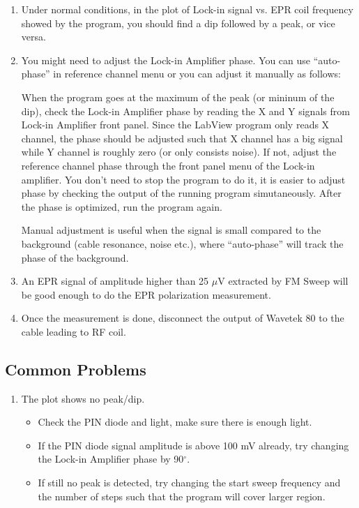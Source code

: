 {\begin{enumerate}
\item Under normal conditions,
 in the plot of Lock-in signal vs. EPR coil frequency showed
by the program, you should find a dip followed by a peak, or vice versa.  

\item You might need to adjust the Lock-in Amplifier phase. You can use
``auto-phase'' in reference channel menu or you can adjust it manually
as follows:

When the program goes at the maximum of the peak (or mininum of the dip), 
check the Lock-in Amplifier phase by reading the X and Y signals from Lock-in
Amplifier front panel.  Since the LabView program only reads X channel, the 
phase should be adjusted such that X channel has a big signal while 
Y channel is roughly zero (or only consists noise).  If not, adjust the 
reference channel phase through the front panel menu of the Lock-in amplifier.
You don't need to stop the program to do it, it is easier to adjust phase
by checking the output of the running program simutaneously.  
After the phase is optimized, run the program again.

Manual adjustment is useful when the signal is small compared to the background
(cable resonance, noise etc.), where ``auto-phase'' will track the phase of the 
background.

\item An EPR signal of amplitude higher than 25 $\mu$V extracted by FM Sweep
will be good enough to do the EPR polarization measurement.

\item Once the measurement is done, disconnect the output of 
Wavetek 80 to the cable leading to RF coil.

\end{enumerate}

\subsection{Common Problems}
\begin{enumerate}

\item The plot shows no peak/dip. 
\begin{itemize}
\item Check the PIN diode and light, make sure there is enough light.
\item  If the PIN diode signal amplitude is above 100 mV already, try changing the 
Lock-in Amplifier phase by 90$^\circ$.
\item  If still no peak is detected, try changing the 
start sweep frequency and the number of steps such that the program
will cover larger region.
\end{itemize}


\end{enumerate}}

